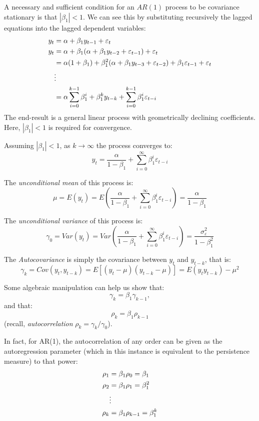 \documentclass[
  oneside]{book}
\begin{document}
A necessary and sufficient condition for an \(AR(1)\) process to be covariance stationary is that \(|\beta_1| < 1\). We can see this by substituting recursively the lagged equations into the lagged dependent variables:
\[
\begin{aligned}
y_t &= \alpha + \beta_1 y_{t-1} + \varepsilon_t \notag \\
y_t &= \alpha + \beta_1 (\alpha + \beta_1 y_{t-2} + \varepsilon_{t-1}) + \varepsilon_t \notag \\
&= \alpha(1+\beta_1) + \beta_1^2 (\alpha + \beta_1 y_{t-3} + \varepsilon_{t-2}) + \beta_1\varepsilon_{t-1} + \varepsilon_t \notag \\
&\vdots  \notag \\
&= \alpha\sum_{i=0}^{k-1}\beta_1^i + \beta_1^k y_{t-k} + \sum_{i=0}^{k-1}\beta_1^i\varepsilon_{t-i}
\end{aligned}
\]
The end-result is a general linear process with geometrically declining coefficients. Here, \(|\beta_1| < 1\) is required for convergence.

Assuming \(|\beta_1| < 1\), as \(k \to \infty\) the process converges to: \[y_t = \frac{\alpha}{1-\beta_1} + \sum_{i=0}^{\infty}\beta_1^i\varepsilon_{t-i}\]

The \emph{unconditional mean} of this process is: \[\mu = E\left(y_t\right) = E\left(\frac{\alpha}{1-\beta_1} + \sum_{i=0}^{\infty}\beta_1^i\varepsilon_{t-i}\right) = \frac{\alpha}{1-\beta_1}\]

The \emph{unconditional variance} of this process is: \[\gamma_0 = Var\left(y_t\right) = Var\left(\frac{\alpha}{1-\beta_1} + \sum_{i=0}^{\infty}\beta_1^i\varepsilon_{t-i}\right) = \frac{\sigma_{\varepsilon}^2}{1-\beta_1^2}\]

The \emph{Autocovariance} is simply the covariance between \(y_t\) and \(y_{t-k}\), that is: \[\gamma_k = Cov(y_t,y_{t-k}) = E[(y_t - \mu)(y_{t-k} - \mu)] = E(y_t y_{t-k}) - \mu^2\]

Some algebraic manipulation can help us show that: \[\gamma_k = \beta_1\gamma_{k-1},\] and that: \[\rho_{k} = \beta_1\rho_{k-1}\] (recall, \emph{autocorrelation} \(\rho_k = \gamma_k/\gamma_0\)).

In fact, for AR(1), the autocorrelation of any order can be given as the autoregression parameter (which in this instance is equivalent to the persistence measure) to that power:
\[
\begin{aligned}
\rho_1 &= \beta_1\rho_0 = \beta_1 \notag \\
\rho_2 &= \beta_1\rho_1 = \beta_1^2 \notag \\
&\vdots \notag \\
\rho_k &= \beta_1\rho_{k-1} = \beta_1^k
\end{aligned}
\]
\end{document}
